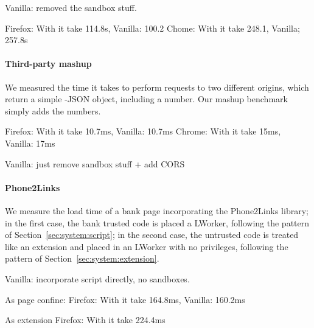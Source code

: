 Vanilla: removed the sandbox stuff.

Firefox: With \sys{} it take 114.8s, Vanilla: 100.2
Chome: With \sys{} it take 248.1, Vanilla; 257.8s

\paragraph{Third-party mashup}

We measured the time it takes to perform requests to two different origins,
which return a simple -JSON object, including a number.
%
Our mashup benchmark simply adds the numbers.


Firefox: With \sys{} it take 10.7ms, Vanilla:  10.7ms
Chrome: With \sys{} it take 15ms, Vanilla:  17ms

Vanilla: just remove sandbox stuff + add CORS

\paragraph{Phone2Links}

We measure the load time of a bank page incorporating the Phone2Links library;
in the first case, the bank trusted code is placed a LWorker, following the
pattern of Section~\ref{sec:system:script}; in the second case, the untrusted
code is treated like an extension and placed in an LWorker with no privileges,
following the pattern of Section~\ref{sec:system:extension}.

Vanilla: incorporate script directly, no sandboxes.


As page confine:
Firefox: With \sys{} it take 164.8ms, Vanilla:  160.2ms

As extension
Firefox: With \sys{} it take 224.4ms
